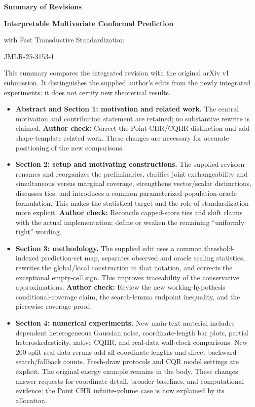 \documentclass[10pt]{article}
\newcommand{\checkauthor}[1]{\textcolor{red!65!black}{\textbf{Author check:} #1}}
\begin{document}
\begin{center}
{\Large\bfseries Summary of Revisions}\par
\vspace{0.3em}
{\bfseries Interpretable Multivariate Conformal Prediction\par
with Fast Transductive Standardization}\par
JMLR-25-3153-1
\end{center}

This summary compares the integrated revision with the original arXiv v1
submission. It distinguishes the supplied author's edits from the newly
integrated experiments; it does not certify new theoretical results.

\begin{itemize}
\item \textbf{Abstract and Section 1: motivation and related work.}
The central motivation and contribution statement are retained; no substantive
rewrite is claimed. \checkauthor{Correct the Point CHR/CQHR distinction and
add shape-template related work.} These changes are necessary for accurate
positioning of the new comparisons.

\item \textbf{Section 2: setup and motivating constructions.}
The supplied revision renames and reorganizes the preliminaries, clarifies
joint exchangeability and simultaneous versus marginal coverage, strengthens
vector/scalar distinctions, discusses ties, and introduces a common
parameterized population-oracle formulation. This makes the statistical
target and the role of standardization more explicit.
\checkauthor{Reconcile capped-score ties and shift claims with the actual
implementation; define or weaken the remaining ``uniformly tight'' wording.}

\item \textbf{Section 3: methodology.}
The supplied edit uses a common threshold-indexed prediction-set map,
separates observed and oracle scaling statistics, rewrites the global/local
construction in that notation, and corrects the exceptional empty-cell sign.
This improves traceability of the conservative approximations.
\checkauthor{Review the new working-hypothesis conditional-coverage claim,
the search-lemma endpoint inequality, and the piecewise coverage proof.}

\item \textbf{Section 4: numerical experiments.}
New main-text material includes dependent heterogeneous Gaussian noise,
coordinate-length bar plots, partial heteroskedasticity, native CQHR, and
real-data wall-clock comparisons. New 200-split real-data reruns add all
coordinate lengths and direct backward-search/fallback counts. Fresh-draw
protocols and CQR model settings are explicit. The original energy example remains in the body. These changes
answer requests for coordinate detail, broader baselines, and computational
evidence; the Point CHR infinite-volume case is now explained by its allocation.


\end{itemize}
\end{document}
